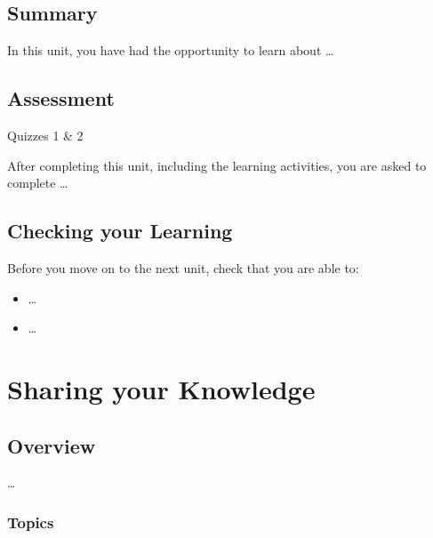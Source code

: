 \documentclass[
]{book}
\providecommand{\tightlist}{%
  \setlength{\itemsep}{0pt}\setlength{\parskip}{0pt}}
\theoremstyle{definition}
\theoremstyle{definition}
\theoremstyle{definition}
\theoremstyle{definition}
\theoremstyle{remark}
\begin{document}
\hypertarget{summary-4}{%
\section*{Summary}\label{summary-4}}

In this unit, you have had the opportunity to learn about \ldots{}

\hypertarget{assessment-4}{%
\section*{Assessment}\label{assessment-4}}

\begin{assessment}
{Quizzes 1 \& 2}

After completing this unit, including the learning activities, you are asked to complete \ldots{}
\end{assessment}

\hypertarget{checking-your-learning-4}{%
\section*{Checking your Learning}\label{checking-your-learning-4}}

\begin{progress}
Before you move on to the next unit, check that you are able to:

\begin{itemize}
\tightlist
\item
  \ldots{}
\item
  \ldots{}
\end{itemize}
\end{progress}

\hypertarget{sharing-your-knowledge}{%
\chapter{Sharing your Knowledge}\label{sharing-your-knowledge}}

\hypertarget{overview-5}{%
\section*{Overview}\label{overview-5}}

\ldots{}

\hypertarget{topics-5}{%
\subsection*{Topics}\label{topics-5}}
\end{document}
